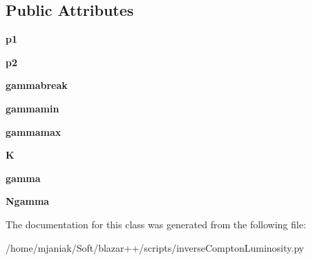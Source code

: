 \subsection*{Public Attributes}
\begin{DoxyCompactItemize}
\item 
\hypertarget{classinverseComptonLuminosity_1_1electrons_a6cb40f3f6895a283477cec3810fa60e9}{{\bfseries p1}}\label{classinverseComptonLuminosity_1_1electrons_a6cb40f3f6895a283477cec3810fa60e9}

\item 
\hypertarget{classinverseComptonLuminosity_1_1electrons_a6402a7dc2a17a4d7d3c09de3e57c932f}{{\bfseries p2}}\label{classinverseComptonLuminosity_1_1electrons_a6402a7dc2a17a4d7d3c09de3e57c932f}

\item 
\hypertarget{classinverseComptonLuminosity_1_1electrons_aee3fcc417517f68cb5c2d3376226c313}{{\bfseries gammabreak}}\label{classinverseComptonLuminosity_1_1electrons_aee3fcc417517f68cb5c2d3376226c313}

\item 
\hypertarget{classinverseComptonLuminosity_1_1electrons_a81ce03fa4416bc6c32a0cc62e7ce25b1}{{\bfseries gammamin}}\label{classinverseComptonLuminosity_1_1electrons_a81ce03fa4416bc6c32a0cc62e7ce25b1}

\item 
\hypertarget{classinverseComptonLuminosity_1_1electrons_ac705340db8cb980841c9da5c5a6553f2}{{\bfseries gammamax}}\label{classinverseComptonLuminosity_1_1electrons_ac705340db8cb980841c9da5c5a6553f2}

\item 
\hypertarget{classinverseComptonLuminosity_1_1electrons_a80a84577ed1becefb955b952a51049f5}{{\bfseries K}}\label{classinverseComptonLuminosity_1_1electrons_a80a84577ed1becefb955b952a51049f5}

\item 
\hypertarget{classinverseComptonLuminosity_1_1electrons_af22cd720bd8ffd17dfbf60cf4532c622}{{\bfseries gamma}}\label{classinverseComptonLuminosity_1_1electrons_af22cd720bd8ffd17dfbf60cf4532c622}

\item 
\hypertarget{classinverseComptonLuminosity_1_1electrons_a265e15db1665bb30abaf099fd597a731}{{\bfseries Ngamma}}\label{classinverseComptonLuminosity_1_1electrons_a265e15db1665bb30abaf099fd597a731}

\end{DoxyCompactItemize}


The documentation for this class was generated from the following file\-:\begin{DoxyCompactItemize}
\item 
/home/mjaniak/\-Soft/blazar++/scripts/inverse\-Compton\-Luminosity.\-py\end{DoxyCompactItemize}
